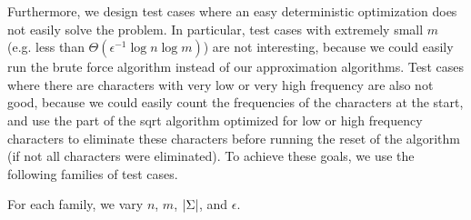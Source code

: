 \documentclass{article}
\theoremstyle{definition}
\newcommand{\eps}{\epsilon}
\DeclarePairedDelimiter{\abs}{\lvert}{\rvert}
\begin{document}
Furthermore, we design test cases where an easy deterministic optimization does not easily solve the problem.
In particular, test cases with extremely small $m$ (e.g. less than $\Theta(\eps^{-1} \log n \log m)$) are not interesting, because we could easily run the brute force algorithm instead of our approximation algorithms.
Test cases where there are characters with very low or very high frequency are also not good, because we could easily count the frequencies of the characters at the start, and use the part of the sqrt algorithm optimized for low or high frequency characters to eliminate these characters before running the reset of the algorithm (if not all characters were eliminated).
To achieve these goals, we use the following families of test cases.

For each family, we vary $n$, $m$, $\abs{\Sigma}$, and $\eps$.
\end{document}
